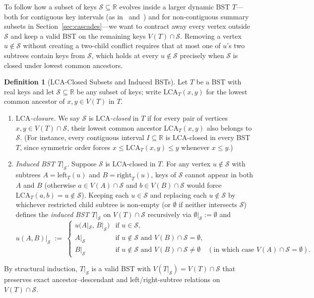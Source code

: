 \documentclass[11pt]{article}
\theoremstyle{definition}
\newtheorem*{definition*}{Definition}
\theoremstyle{remark}
\newcommand{\LCA}{\mathrm{LCA}}
\begin{document}
To follow how a subset of keys $\mathcal{S} \subseteq \mathbb{R}$ evolves inside a larger dynamic BST $T$---both for contiguous key intervals (as in~\cite{Tarjan1985} and~\cite[Section~2.1]{Sundar1992}) and for non-contiguous summary subsets in Section~\ref{sec:cascades}---we want to contract away every vertex outside $\mathcal{S}$ and keep a valid BST on the remaining keys $V(T) \cap \mathcal{S}$. Removing a vertex $u \notin \mathcal{S}$ without creating a two-child conflict requires that at most one of $u$'s two subtrees contain keys from $\mathcal{S}$, which holds at every $u \notin \mathcal{S}$ precisely when $\mathcal{S}$ is closed under lowest common ancestors.

\begin{definition*}[$\LCA$-Closed Subsets and Induced BSTs]
Let $T$ be a BST with real keys and let $\mathcal{S} \subseteq \mathbb{R}$ be any subset of keys; write $\LCA_T(x, y)$ for the lowest common ancestor of $x, y \in V(T)$ in $T$.
\begin{enumerate}[label=(\arabic*), leftmargin=2em, itemsep=2pt]
  \item \emph{$\LCA$-closure.} We say $\mathcal{S}$ is \emph{$\LCA$-closed} in $T$ if for every pair of vertices $x, y \in V(T) \cap \mathcal{S}$, their lowest common ancestor $\LCA_T(x, y)$ also belongs to $\mathcal{S}$. (For instance, every contiguous interval $I \subseteq \mathbb{R}$ is $\LCA$-closed in every BST $T$, since symmetric order forces $x \le \LCA_T(x, y) \le y$ whenever $x \le y$.)
  \item \emph{Induced BST $T|_{\mathcal{S}}$.} Suppose $\mathcal{S}$ is $\LCA$-closed in $T$. For any vertex $u \notin \mathcal{S}$ with subtrees $A = \mathrm{left}_T(u)$ and $B = \mathrm{right}_T(u)$, keys of $\mathcal{S}$ cannot appear in both $A$ and $B$ (otherwise $a \in V(A) \cap \mathcal{S}$ and $b \in V(B) \cap \mathcal{S}$ would force $\LCA_T(a, b) = u \notin \mathcal{S}$). Keeping each $u \in \mathcal{S}$ and replacing each $u \notin \mathcal{S}$ by whichever restricted child subtree is non-empty (or $\emptyset$ if neither intersects $\mathcal{S}$) defines the \emph{induced BST} $T|_{\mathcal{S}}$ on $V(T) \cap \mathcal{S}$ recursively via $\emptyset|_{\mathcal{S}} := \emptyset$ and
  \[
  u(A, B)\big|_{\mathcal{S}} \;:=\;
  \begin{cases}
  u\big(A|_{\mathcal{S}},\, B|_{\mathcal{S}}\big) & \text{if } u \in \mathcal{S},\\
  A|_{\mathcal{S}} & \text{if } u \notin \mathcal{S} \text{ and } V(B) \cap \mathcal{S} = \emptyset,\\
  B|_{\mathcal{S}} & \text{if } u \notin \mathcal{S} \text{ and } V(B) \cap \mathcal{S} \ne \emptyset \quad (\text{in which case } V(A) \cap \mathcal{S} = \emptyset).
  \end{cases}
  \]
\end{enumerate}
By structural induction, $T|_{\mathcal{S}}$ is a valid BST with $V(T|_{\mathcal{S}}) = V(T) \cap \mathcal{S}$ that preserves exact ancestor--descendant and left/right-subtree relations on $V(T) \cap \mathcal{S}$.
\end{definition*}
\end{document}
